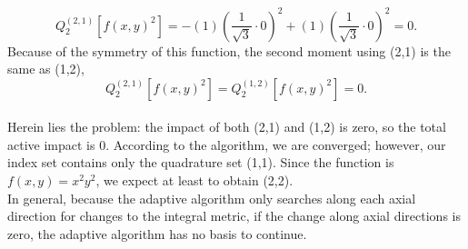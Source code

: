 \documentclass[11pt]{article}
\begin{document}
\begin{equation}
Q^{(2,1)}_2[f(x,y)^2] = -(1)\left(\frac{1}{\sqrt{3}}\cdot 0\right)^2 + (1)\left(\frac{1}{\sqrt{3}}\cdot 0\right)^2 = 0.
\end{equation}
Because of the symmetry of this function, the second moment using (2,1) is the same as (1,2),
\begin{equation}
Q^{(2,1)}_2[f(x,y)^2] = Q^{(1,2)}_2[f(x,y)^2] = 0.
\end{equation}
\\
Herein lies the problem: the impact of both (2,1) and (1,2) is zero, so the total active impact is 0. According to the algorithm, we are converged; however, our index set contains only the quadrature set (1,1).  Since the function is $f(x,y)=x^2y^2$, we expect at least to obtain (2,2).  \\

In general, because the adaptive algorithm only searches along each axial direction for changes to the integral metric, if the change along axial directions is zero, the adaptive algorithm has no basis to continue.
\end{document}
